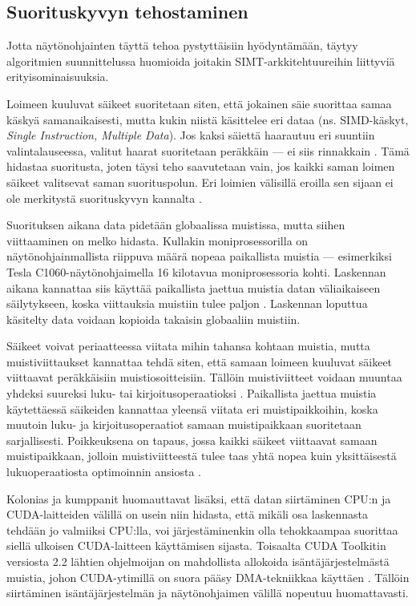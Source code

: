 \documentclass[a4paper,11pt]{article}
\newcommand{\engl}[1]{\foreignlanguage{english}{\em #1}}
\begin{document}
\subsection{Suorituskyvyn tehostaminen}

Jotta näytönohjainten täyttä tehoa pystyttäisiin hyödyntämään, täytyy algoritmien suunnittelussa huomioida joitakin SIMT-arkkitehtuureihin liittyviä erityisominaisuuksia.

Loimeen kuuluvat säikeet suoritetaan siten, että jokainen säie suorittaa samaa käskyä samanaikaisesti, mutta kukin niistä käsittelee eri dataa (ns. SIMD-käskyt, \engl{Single Instruction, Multiple Data}). Jos kaksi säiettä haarautuu eri suuntiin valintalauseessa, valitut haarat suoritetaan peräkkäin --- ei siis rinnakkain \cite{leischner2010}. Tämä hidastaa suoritusta, joten täysi teho saavutetaan vain, jos kaikki saman loimen säikeet valitsevat saman suorituspolun. Eri loimien välisillä eroilla sen sijaan ei ole merkitystä suorituskyvyn kannalta \cite{satish2009}.

Suorituksen aikana data pidetään globaalissa muistissa, mutta siihen viittaaminen on melko hidasta. Kullakin moniprosessorilla on näytönohjainmallista riippuva määrä nopeaa paikallista muistia --- esimerkiksi Tesla C1060-näytönohjaimella 16 kilotavua moniprosessoria kohti. Laskennan aikana kannattaa siis käyttää paikallista jaettua muistia datan väliaikaiseen säilytykseen, koska viittauksia muistiin tulee paljon \cite{leischner2010}. Laskennan loputtua käsitelty data voidaan kopioida takaisin globaaliin muistiin.

Säikeet voivat periaatteessa viitata mihin tahansa kohtaan muistia, mutta muistiviittaukset kannattaa tehdä siten, että samaan loimeen kuuluvat säikeet viittaavat peräkkäisiin muistiosoitteisiin. Tällöin muistiviitteet voidaan muuntaa yhdeksi suureksi luku- tai kirjoitusoperaatioksi \cite{satish2009}. Paikallista jaettua muistia käytettäessä säikeiden kannattaa yleensä viitata eri muistipaikkoihin, koska muutoin luku- ja kirjoitusoperaatiot samaan muistipaikkaan suoritetaan sarjallisesti. Poikkeuksena on tapaus, jossa kaikki säikeet viittaavat samaan muistipaikkaan, jolloin muistiviitteestä tulee taas yhtä nopea kuin yksittäisestä lukuoperaatiosta optimoinnin ansiosta \cite{cederman2009}.

Kolonias ja kumppanit \cite{kolonias2011} huomauttavat lisäksi, että datan siirtäminen CPU:n ja CUDA-laitteiden välillä on usein niin hidasta, että mikäli osa laskennasta tehdään jo valmiiksi CPU:lla, voi järjestäminenkin olla tehokkaampaa suorittaa siellä ulkoisen CUDA-laitteen käyttämisen sijasta. Toisaalta CUDA Toolkitin versiosta 2.2 lähtien ohjelmoijan on mahdollista allokoida isäntäjärjestelmästä muistia, johon CUDA-ytimillä on suora pääsy DMA-tekniikkaa käyttäen \cite{kolonias2011}. Tällöin siirtäminen isäntäjärjestelmän ja näytönohjaimen välillä nopeutuu huomattavasti.
\end{document}
